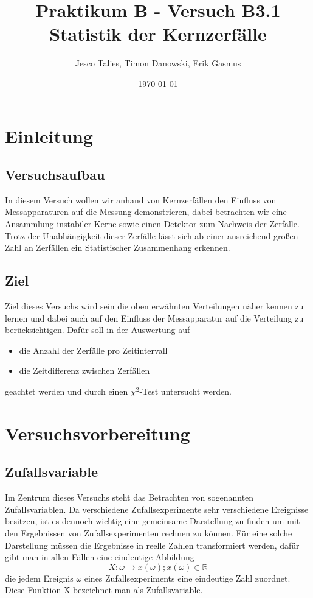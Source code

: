 \documentclass{article}
\begin{document}
    \title{Praktikum B - Versuch B3.1 Statistik der Kernzerfälle}
    \date{\today}
    \author{Jesco Talies, Timon Danowski, Erik Gasmus}
    \maketitle
    \newpage

    \tableofcontents
    \newpage
    
    \section{Einleitung}
        \subsection{Versuchsaufbau}
            In diesem Versuch wollen wir anhand von Kernzerfällen den Einfluss von Messapparaturen auf
            die Messung demonstrieren, dabei betrachten wir eine Ansammlung instabiler Kerne sowie einen Detektor
            zum Nachweis der Zerfälle. Trotz der Unabhängigkeit dieser Zerfälle lässt sich ab einer ausreichend
            großen Zahl an Zerfällen ein Statistischer Zusammenhang erkennen.
        \subsection{Ziel}
            Ziel dieses Versuchs wird sein die oben erwähnten Verteilungen näher kennen zu lernen und dabei
            auch auf den Einfluss der Messapparatur auf die Verteilung zu berücksichtigen. Dafür soll in der 
            Auswertung auf
            \begin{itemize}
                \item die Anzahl der Zerfälle pro Zeitintervall
                \item die Zeitdifferenz zwischen Zerfällen
            \end{itemize}
            geachtet werden und durch einen $\chi^2$-Test untersucht werden.
    
    \section{Versuchsvorbereitung}
            \subsection{Zufallsvariable}
                Im Zentrum dieses Versuchs steht das Betrachten von sogenannten Zufallsvariablen. Da verschiedene Zufallsexperimente
                sehr verschiedene Ereignisse besitzen, ist es dennoch wichtig eine gemeinsame Darstellung zu finden um mit den
                Ergebnissen von Zufallsexperimenten rechnen zu können. Für eine solche Darstellung müssen die Ergebnisse in reelle
                Zahlen transformiert werden, dafür gibt man in allen Fällen eine eindeutige Abbildung
                $$ X: \omega \rightarrow x( \omega ) ; x( \omega ) \in \mathbb{R} $$
                die jedem Ereignis $\omega$ eines Zufallsexperiments eine eindeutige Zahl zuordnet.
                Diese Funktion X bezeichnet man als Zufallsvariable.
\end{document}
